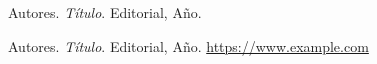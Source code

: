 \cleardoublepage
{}
{}
\begin{thebibliography}{9}
	Autores.
	\textit{Título}.
	Editorial, Año.

	Autores.
	\textit{Título}.
	Editorial, Año.
	\url{https://www.example.com}
\end{thebibliography}

